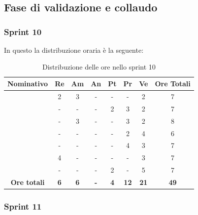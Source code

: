 \subsection{Fase di validazione e collaudo}

\subsubsection{Sprint 10}

In questo  la distribuzione oraria è la seguente:
\begin{table}[H]
		\begin{center}
			\setlength{\aboverulesep}{0pt}
			\setlength{\belowrulesep}{0pt}
			\setlength{\extrarowheight}{.75ex}
			\begin{tabular}{ c c c c c c c c }
				\rowcolor{AzzurroGruppo!30} 
				\textbf{Nominativo} & \textbf{Re} & \textbf{Am} & \textbf{An} & \textbf{Pt} & \textbf{Pr} & \textbf{Ve} & \textbf{Ore Totali}  \\
				\toprule
				\Davide    & 2 & 3 & - & - & - & 2 & 7 \\
				\Giosue    & - & - & - & 2 & 3 & 2 & 7 \\
				\Francesco & - & 3 & - & - & 3 & 2 & 8\\
				\Daniele   & - & - & - & - & 2 & 4 & 6\\
				\Lucrezia  & - & - & - & - & 4 & 3 & 7\\
				\Matteo    & 4 & - & - & - & - & 3 & 7\\
				\Tommaso   & - & - & - & 2 & - & 5 & 7\\
				 \textbf{Ore totali} & \textbf{6} & \textbf{6} & \textbf{-} & \textbf{4} & \textbf{12} & \textbf{21} & \textbf{49} \\
				\bottomrule
			\end{tabular}
			\caption{Distribuzione delle ore nello sprint 10}
		\end{center}
	\end{table}


\subsubsection{Sprint 11}


